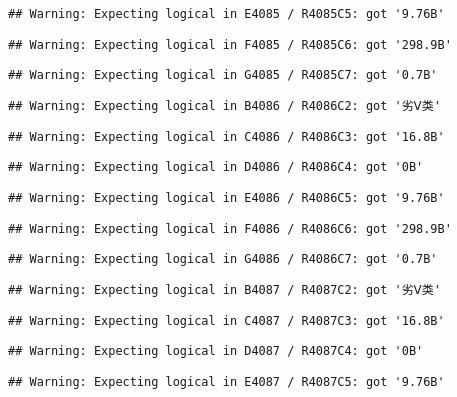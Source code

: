 \documentclass[
]{article}
\begin{document}
\begin{verbatim}
## Warning: Expecting logical in E4085 / R4085C5: got '9.76B'
\end{verbatim}

\begin{verbatim}
## Warning: Expecting logical in F4085 / R4085C6: got '298.9B'
\end{verbatim}

\begin{verbatim}
## Warning: Expecting logical in G4085 / R4085C7: got '0.7B'
\end{verbatim}

\begin{verbatim}
## Warning: Expecting logical in B4086 / R4086C2: got '劣Ⅴ类'
\end{verbatim}

\begin{verbatim}
## Warning: Expecting logical in C4086 / R4086C3: got '16.8B'
\end{verbatim}

\begin{verbatim}
## Warning: Expecting logical in D4086 / R4086C4: got '0B'
\end{verbatim}

\begin{verbatim}
## Warning: Expecting logical in E4086 / R4086C5: got '9.76B'
\end{verbatim}

\begin{verbatim}
## Warning: Expecting logical in F4086 / R4086C6: got '298.9B'
\end{verbatim}

\begin{verbatim}
## Warning: Expecting logical in G4086 / R4086C7: got '0.7B'
\end{verbatim}

\begin{verbatim}
## Warning: Expecting logical in B4087 / R4087C2: got '劣Ⅴ类'
\end{verbatim}

\begin{verbatim}
## Warning: Expecting logical in C4087 / R4087C3: got '16.8B'
\end{verbatim}

\begin{verbatim}
## Warning: Expecting logical in D4087 / R4087C4: got '0B'
\end{verbatim}

\begin{verbatim}
## Warning: Expecting logical in E4087 / R4087C5: got '9.76B'
\end{verbatim}
\end{document}
